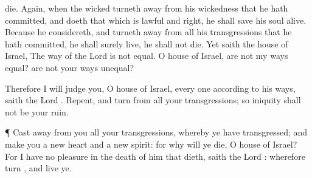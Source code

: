 {die.
Again, when the
wicked
{} turneth
away from his
wickedness that he hath
committed, and
doeth that which is
lawful and
right, he shall
save his
soul
alive.
Because he
considereth, and turneth
away from all his
transgressions that he hath
committed, he shall
surely
live, he shall not
die.
Yet
saith the
house of
Israel, The
way of the
Lord is not
equal. O
house of
Israel, are not my
ways
equal? are not your
ways
unequal?
\par }{\PP {}Therefore I will
judge you, O
house of
Israel, every
one according to his
ways,
saith the
Lord
{}.
Repent, and
turn
{} from all your
transgressions; so
iniquity shall not be your
ruin.
\par }{\PP {}¶ Cast
away from you all your
transgressions, whereby ye have
transgressed; and
make you a
new
heart and a
new
spirit: for why will ye
die, O
house of
Israel?
For I have no
pleasure in the
death of him that
dieth,
saith the
Lord
{}: wherefore
turn
{}, and
live ye.

}
